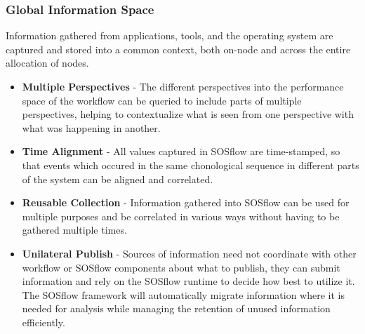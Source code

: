 \subsubsection{Global Information Space}
       Information gathered from applications, tools, and the
       operating system are captured and stored into a common context,
       both on-node and across the entire allocation of nodes.
%
     \begin{itemize}
        \item \textbf{Multiple Perspectives} - The different
          perspectives into the performance space of the workflow can
          be queried to include parts of multiple
          perspectives, helping to contextualize what is seen from one
          perspective with what was happening in another.
        \item \textbf{Time Alignment} - All values captured in SOSflow
          are time-stamped, so that events which occured in the same
          chonological sequence in different parts of the system can be
          aligned and correlated.
        \item \textbf{Reusable Collection} - Information gathered into
          SOSflow can be used for multiple purposes and be correlated
          in various ways without having to be gathered multiple
          times.
        \item \textbf{Unilateral Publish} - Sources of information
          need not coordinate with other workflow or SOSflow
          components about what to publish, they can submit
          information and rely on the SOSflow runtime to decide
          how best to utilize it.
          The SOSflow framework will automatically migrate
          information where it is needed for analysis while managing
          the retention of unused information efficiently.
     \end{itemize}





